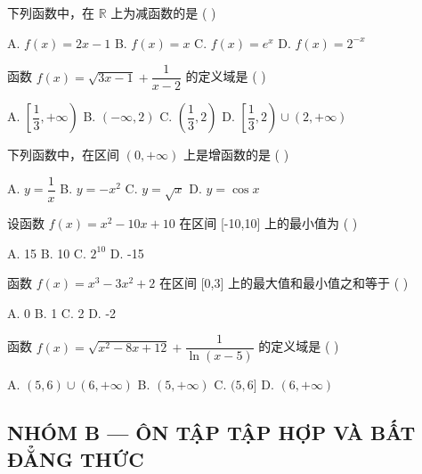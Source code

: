 \documentclass[11pt, a4paper]{article}
\begin{document}
\begin{baitap}[13]
下列函数中，在 $\mathbb{R}$ 上为减函数的是 ( )
\par\vspace{3pt}
\noindent A. $f(x) = 2x - 1$ \quad B. $f(x) = x$ \quad C. $f(x) = e^x$ \quad D. $f(x) = 2^{-x}$
\end{baitap}

\begin{baitap}[14]
函数 $f(x) = \sqrt{3x - 1} + \dfrac{1}{x-2}$ 的定义域是 ( )
\par\vspace{3pt}
\noindent A. $\left[\dfrac{1}{3}, +\infty\right)$ \quad B. $(-\infty, 2)$ \quad C. $\left(\dfrac{1}{3}, 2\right)$ \quad D. $\left[\dfrac{1}{3}, 2\right) \cup (2, +\infty)$
\end{baitap}

\begin{baitap}[15]
下列函数中，在区间 $(0, +\infty)$ 上是增函数的是 ( )
\par\vspace{3pt}
\noindent A. $y = \dfrac{1}{x}$ \quad B. $y = -x^2$ \quad C. $y = \sqrt{x}$ \quad D. $y = \cos x$
\end{baitap}

\begin{baitap}[16]
设函数 $f(x) = x^2 - 10x + 10$ 在区间 [-10,10] 上的最小值为 ( )
\par\vspace{3pt}
\noindent A. 15 \quad B. 10 \quad C. $2^{10}$ \quad D. -15
\end{baitap}

\begin{baitap}[17]
函数 $f(x) = x^3 - 3x^2 + 2$ 在区间 [0,3] 上的最大值和最小值之和等于 ( )
\par\vspace{3pt}
\noindent A. 0 \quad B. 1 \quad C. 2 \quad D. -2
\end{baitap}

\begin{baitap}[18]
函数 $f(x) = \sqrt{x^2 - 8x + 12} + \dfrac{1}{\ln(x-5)}$ 的定义域是 ( )
\par\vspace{3pt}
\noindent A. $(5,6) \cup (6, +\infty)$ \quad B. $(5, +\infty)$ \quad C. $(5,6]$ \quad D. $(6, +\infty)$
\end{baitap}

\subsection*{NHÓM B — ÔN TẬP TẬP HỢP VÀ BẤT ĐẲNG THỨC}
\end{document}

